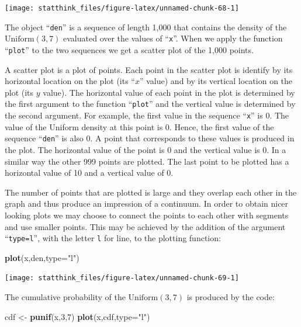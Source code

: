\documentclass[
]{krantz}
\makeatletter
\newenvironment{Shaded}{\begin{snugshade}}{\end{snugshade}}
\newcommand{\DataTypeTok}[1]{\textcolor[rgb]{0.13,0.29,0.53}{#1}}
\newcommand{\DecValTok}[1]{\textcolor[rgb]{0.00,0.00,0.81}{#1}}
\newcommand{\KeywordTok}[1]{\textcolor[rgb]{0.13,0.29,0.53}{\textbf{#1}}}
\newcommand{\NormalTok}[1]{#1}
\newcommand{\StringTok}[1]{\textcolor[rgb]{0.31,0.60,0.02}{#1}}
\newenvironment{kframe}{%
\medskip{}
\setlength{\fboxsep}{.8em}
 \def\at@end@of@kframe{}%
 \ifinner\ifhmode%
  \def\at@end@of@kframe{\end{minipage}}%
  \begin{minipage}{\columnwidth}%
 \fi\fi%
 \def\FrameCommand##1{\hskip\@totalleftmargin \hskip-\fboxsep
 \colorbox{shadecolor}{##1}\hskip-\fboxsep
     \hskip-\linewidth \hskip-\@totalleftmargin \hskip\columnwidth}%
 \MakeFramed {\advance\hsize-\width
   \@totalleftmargin\z@ \linewidth\hsize
   \@setminipage}}%
 {\par\unskip\endMakeFramed%
 \at@end@of@kframe}
\renewenvironment{Shaded}{\begin{kframe}}{\end{kframe}}
\theoremstyle{definition}
\theoremstyle{definition}
\theoremstyle{definition}
\theoremstyle{remark}
\makeatother
\begin{document}
\begin{center}\texttt{[image: statthink\_files/figure-latex/unnamed-chunk-68-1]} \end{center}

The object ``\texttt{den}'' is a sequence of length 1,000 that contains the
density of the \(\mathrm{Uniform}(3,7)\) evaluated over the values of
``\texttt{x}''. When we apply the function ``\texttt{plot}'' to the two sequences we get a
scatter plot of the 1,000 points.

A scatter plot is a plot of points. Each point in the scatter plot is
identify by its horizontal location on the plot (its ``\(x\)'' value) and by
its vertical location on the plot (its \(y\) value). The horizontal value
of each point in the plot is determined by the first argument to the
function ``\texttt{plot}'' and the vertical value is determined by the second
argument. For example, the first value in the sequence ``\texttt{x}'' is 0. The
value of the Uniform density at this point is 0. Hence, the first value
of the sequence ``\texttt{den}'' is also 0. A point that corresponds to these
values is produced in the plot. The horizontal value of the point is 0
and the vertical value is 0. In a similar way the other 999 points are
plotted. The last point to be plotted has a horizontal value of 10 and a
vertical value of 0.

The number of points that are plotted is large and they overlap each
other in the graph and thus produce an impression of a continuum. In
order to obtain nicer looking plots we may choose to connect the points
to each other with segments and use smaller points. This may be achieved
by the addition of the argument ``\texttt{type=l}'', with the letter \texttt{l} for
line, to the plotting function:

\begin{Shaded}
\begin{Highlighting}[]
\KeywordTok{plot}\NormalTok{(x,den,}\DataTypeTok{type=}\StringTok{"l"}\NormalTok{)}
\end{Highlighting}
\end{Shaded}

\begin{center}\texttt{[image: statthink\_files/figure-latex/unnamed-chunk-69-1]} \end{center}

The cumulative probability of the \(\mathrm{Uniform}(3,7)\) is produced by the code:

\begin{Shaded}
\begin{Highlighting}[]
\NormalTok{cdf <-}\StringTok{ }\KeywordTok{punif}\NormalTok{(x,}\DecValTok{3}\NormalTok{,}\DecValTok{7}\NormalTok{)}
\KeywordTok{plot}\NormalTok{(x,cdf,}\DataTypeTok{type=}\StringTok{"l"}\NormalTok{)}
\end{Highlighting}
\end{Shaded}
\end{document}
